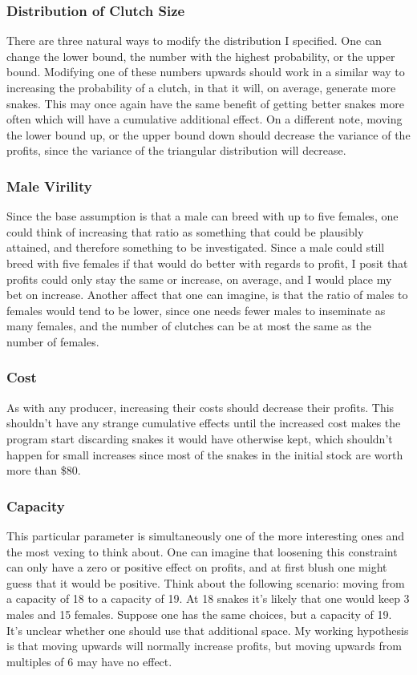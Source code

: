 \documentclass{article}
\begin{document}
		\subsubsection*{Distribution of Clutch Size}
		\indent\indent There are three natural ways to modify the distribution I specified. One can change the lower bound, the number with the highest probability, or the upper bound. Modifying one of these numbers upwards should work in a similar way to increasing the probability of a clutch, in that it will, on average, generate more snakes. This may once again have the same benefit of getting better snakes more often which will have a cumulative additional effect. On a different note, moving the lower bound up, or the upper bound down should decrease the variance of the profits, since the variance of the triangular distribution will decrease.
		\subsubsection*{Male Virility}
		\indent\indent Since the base assumption is that a male can breed with up to five females, one could think of increasing that ratio as something that could be plausibly attained, and therefore something to be investigated. Since a male could still breed with five females if that would do better with regards to profit, I posit that profits could only stay the same or increase, on average, and I would place my bet on increase. Another affect that one can imagine, is that the ratio of males to females would tend to be lower, since one needs fewer males to inseminate as many females, and the number of clutches can be at most the same as the number of females.
		\subsubsection*{Cost}
		\indent\indent As with any producer, increasing their costs should decrease their profits. This shouldn't have any strange cumulative effects until the increased cost makes the program start discarding snakes it would have otherwise kept, which shouldn't happen for small increases since most of the snakes in the initial stock are worth more than \$80.
		\subsubsection*{Capacity}
		\indent\indent This particular parameter is simultaneously one of the more interesting ones and the most vexing to think about. One can imagine that loosening this constraint can only have a zero or positive effect on profits, and at first blush one might guess that it would be positive. Think about the following scenario: moving from a capacity of 18 to a capacity of 19. At 18 snakes it's likely that one would keep 3 males and 15 females. Suppose one has the same choices, but a capacity of 19. It's unclear whether one should use that additional space. My working hypothesis is that moving upwards will normally increase profits, but moving upwards from multiples of 6 may have no effect.
\end{document}
